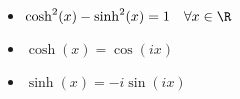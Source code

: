 \begin{itemize}[leftmargin=*]
    \item $\cosh^2(x) - \sinh^2(x) = 1 \quad \forall x \in \R$
    \item $\cosh(x) = \cos(ix)$
    \item $\sinh(x) = -i \sin(ix)$
\end{itemize}